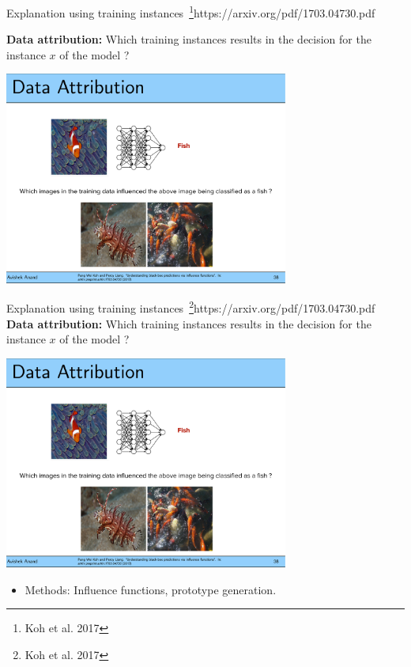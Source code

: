 \documentclass[11pt,compress,t,notes=noshow, xcolor=table]{beamer}
\begin{document}
\begin{vbframe}{Explanation using training instances~\footnote{Koh et al. 2017}{https://arxiv.org/pdf/1703.04730.pdf}}
	
	\textbf{Data attribution:} Which training instances results in the decision for the instance $x$ of the model ?
	\begin{center}
		\includegraphics[page=1, width=0.7\textwidth]{figure/fish-attribution.pdf}
	\end{center}
	
\end{vbframe}

\begin{vbframe}{Explanation using training instances~\footnote{Koh et al. 2017}{https://arxiv.org/pdf/1703.04730.pdf}}
	\textbf{Data attribution:} Which training instances results in the decision for the instance $x$ of the model ?
	\begin{center}
		\includegraphics[page=1, width=0.7\textwidth]{figure/prototypes-fish.pdf}
	\end{center}
	\begin{itemize}
		\item Methods: 
		Influence functions, prototype generation.
	\end{itemize}
\end{vbframe}
\end{document}
